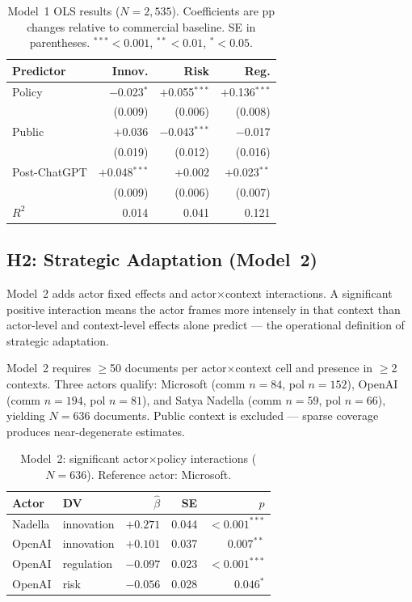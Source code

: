 \documentclass[11pt,a4paper,twocolumn]{article}
\begin{document}
\begin{table}[t]
\centering
\caption{Model~1 OLS results ($N = 2{,}535$). Coefficients are pp changes
relative to commercial baseline. SE in parentheses.
${}^{***}{<}0.001$, ${}^{**}{<}0.01$, ${}^{*}{<}0.05$.}
\label{tab:m1}
\small
\setlength{\tabcolsep}{4pt}
\begin{tabular}{lrrr}
\toprule
\textbf{Predictor} & \textbf{Innov.} & \textbf{Risk} & \textbf{Reg.} \\
\midrule
Policy
  & $-$0.023$^{*}$ & $+$0.055$^{***}$ & $+$0.136$^{***}$ \\
  & (0.009)        & (0.006)          & (0.008) \\
Public
  & $+$0.036       & $-$0.043$^{***}$ & $-$0.017 \\
  & (0.019)        & (0.012)          & (0.016) \\
Post-ChatGPT
  & $+$0.048$^{***}$ & $+$0.002       & $+$0.023$^{**}$ \\
  & (0.009)          & (0.006)        & (0.007) \\
\midrule
$R^2$ & 0.014 & 0.041 & 0.121 \\
\bottomrule
\end{tabular}
\end{table}

\subsection{H2: Strategic Adaptation (Model~2)}

Model~2 adds actor fixed effects and actor$\times$context interactions. A
significant positive interaction means the actor frames more intensely in that
context than actor-level and context-level effects alone predict — the
operational definition of strategic adaptation.

Model~2 requires $\geq$50 documents per actor$\times$context cell and presence
in $\geq$2 contexts. Three actors qualify: Microsoft (comm $n=84$, pol $n=152$),
OpenAI (comm $n=194$, pol $n=81$), and Satya Nadella (comm $n=59$, pol $n=66$),
yielding $N = 636$ documents. Public context is excluded — sparse coverage
produces near-degenerate estimates.

\begin{table}[t]
\centering
\caption{Model~2: significant actor$\times$policy interactions ($N=636$).
         Reference actor: Microsoft.}
\label{tab:m2}
\small
\begin{tabular}{llrrr}
\toprule
\textbf{Actor} & \textbf{DV} & $\hat{\beta}$ & \textbf{SE} & $p$ \\
\midrule
Nadella & innovation & $+0.271$ & 0.044 & ${<}0.001^{***}$ \\
OpenAI  & innovation & $+0.101$ & 0.037 & $0.007^{**}$ \\
\midrule
OpenAI  & regulation & $-0.097$ & 0.023 & ${<}0.001^{***}$ \\
OpenAI  & risk       & $-0.056$ & 0.028 & $0.046^{*}$ \\
\bottomrule
\end{tabular}
\end{table}
\end{document}
